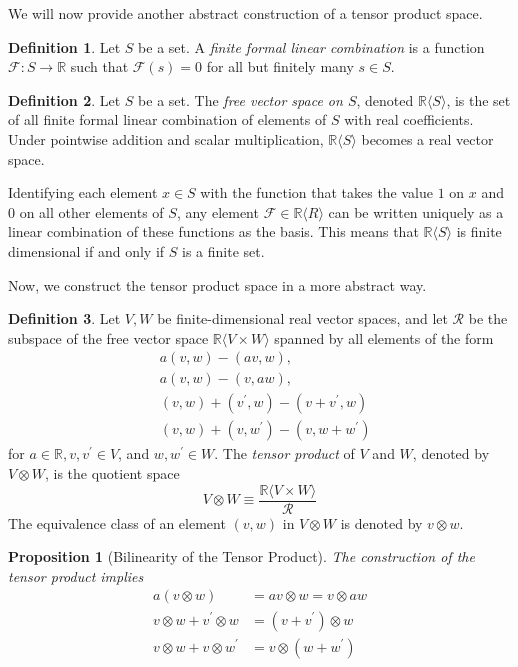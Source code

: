 \documentclass{article}
\newtheorem{proposition}[theorem]{Proposition}
\theoremstyle{remark}
\theoremstyle{definition}
\newtheorem{definition}{Definition}[section]
\begin{document}
    We will now provide another abstract construction of a tensor product space. 

    \begin{definition}
    Let $S$ be a set. A \textit{finite formal linear combination} is a function $\mathcal{F}: S\longrightarrow \mathbb{R}$ such that $\mathcal{F}(s) = 0$ for all but finitely many $s \in S$. 
    \end{definition}

    \begin{definition}
    Let $S$ be a set. The \textit{free vector space on $S$}, denoted $\mathbb{R} \langle S \rangle$, is the set of all finite formal linear combination of elements of $S$ with real coefficients. Under pointwise addition and scalar multiplication, $\mathbb{R} \langle S \rangle$ becomes a real vector space. 
    \end{definition}

    Identifying each element $x \in S$ with the function that takes the value $1$ on $x$ and $0$ on all other elements of $S$, any element $\mathcal{F} \in \mathbb{R} \langle R \rangle$ can be written uniquely as a linear combination of these functions as the basis. This means that $\mathbb{R} \langle S \rangle$ is finite dimensional if and only if $S$ is a finite set. 

    Now, we construct the tensor product space in a more abstract way. 
    \begin{definition}
    Let $V, W$ be finite-dimensional real vector spaces, and let $\mathcal{R}$ be the subspace of the free vector space $\mathbb{R} \langle V \times W \rangle$ spanned by all elements of the form 
    \begin{align*}
        &a (v, w) - (a v, w), \\
        &a (v, w) - (v, a w), \\
        &(v, w) + (v^\prime, w) - (v + v^\prime, w) \\
        &(v, w) + (v, w^\prime) - (v, w + w^\prime) 
    \end{align*}
    for $a \in \mathbb{R}, v, v^\prime \in V$, and $w, w^\prime \in W$. The \textit{tensor product} of $V$ and $W$, denoted by $V \otimes W$, is the quotient space 
    \[V \otimes W \equiv \frac{\mathbb{R} \langle V \times W \rangle}{\mathcal{R}}\]
    The equivalence class of an element $(v, w)$ in $V \otimes W$ is denoted by $v \otimes w$. 
    \end{definition}

    \begin{proposition}[Bilinearity of the Tensor Product]
    The construction of the tensor product implies 
    \begin{align*}
        a (v \otimes w) & = av \otimes w = v \otimes a w \\
        v \otimes w + v^\prime \otimes w & = (v + v^\prime) \otimes w \\
        v \otimes w + v \otimes w^\prime & = v \otimes (w + w^\prime) 
    \end{align*}
    \end{proposition}
\end{document}
